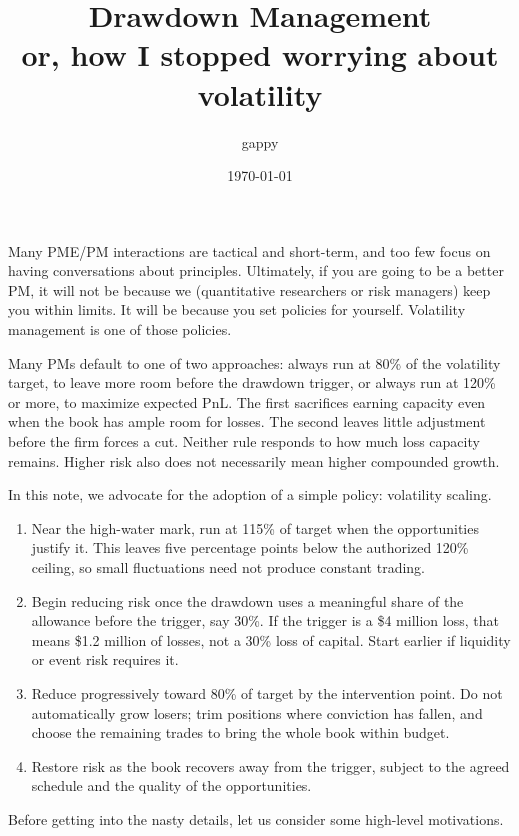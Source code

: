\documentclass[11pt]{gappyarticle}
\title{Drawdown Management\\or, how I stopped worrying about volatility}
\author{gappy}
\date{\today}
\begin{document}
\maketitle
\raggedbottom

Many PME/PM interactions are tactical and short-term, and too few focus on
having conversations about principles. Ultimately, if you are going to be a
better PM, it will not be because we (quantitative researchers or risk managers) keep you within
limits. It will be because you set policies for yourself. Volatility management is one of those policies.  

Many PMs default to one of two approaches: always run at 80\% of the volatility
target, to leave more room before the drawdown trigger, or always run at 120\%
or more, to maximize expected PnL. The first sacrifices earning capacity even
when the book has ample room for losses. The second leaves little adjustment
before the firm forces a cut. Neither rule responds to how much loss capacity
remains. Higher risk also does not necessarily mean higher compounded growth.

In this note, we advocate for the adoption of a simple policy: volatility scaling. 


\begin{redbox}
\begin{enumerate}
\item Near the high-water mark, run at 115\% of target when the opportunities
justify it. This leaves five percentage points below the authorized 120\%
ceiling, so small fluctuations need not produce constant trading.
\item Begin reducing risk once the drawdown uses a meaningful share of the
allowance before the trigger, say 30\%. If the trigger is a \$4 million loss,
that means \$1.2 million of losses, not a 30\% loss of capital. Start earlier
if liquidity or event risk requires it.
\item Reduce progressively toward 80\% of target by the intervention point.
Do not automatically grow losers; trim positions where conviction has fallen,
and choose the remaining trades to bring the whole book within budget.
\item Restore risk as the book recovers away from the trigger, subject to
the agreed schedule and the quality of the opportunities.
\end{enumerate}	
\end{redbox}
 

Before getting into the nasty details, let us consider some high-level motivations.
\end{document}
